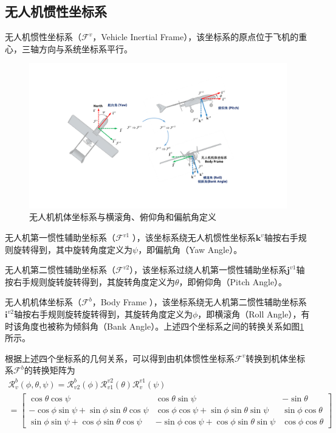 \subsection{无人机惯性坐标系}
无人机惯性坐标系（$\mathcal{F}^v$，Vehicle Inertial Frame），该坐标系的原点位于飞机的重心，三轴方向与系统坐标系平行。

\begin{figure}[htb]   
	\centering
	\includegraphics[width=\textwidth]{figs/chp02/chp02_02_uav_rpy.pdf}
	\caption{无人机机体坐标系与横滚角、俯仰角和偏航角定义}
	\label{fig:chp02_02_uav_rpy}
\end{figure}

无人机第一惯性辅助坐标系（$\mathcal{F}^{v1}$ ），该坐标系绕无人机惯性坐标系$\mathbf{k}^v$轴按右手规则旋转得到，其中旋转角度定义为$\psi$，即偏航角（Yaw Angle）。

无人机第二惯性辅助坐标系（$\mathcal{F}^{v2}$），该坐标系过绕人机第一惯性辅助坐标系$\mathbf{j}^{v1}$轴按右手规则旋转旋转得到，其旋转角度定义为$\theta$，即俯仰角（Pitch Angle）。

无人机机体坐标系（$\mathcal{F}^b$，Body Frame ），该坐标系绕无人机第二惯性辅助坐标系$\mathbf{i}^{v2}$轴按右手规则旋转旋转得到，其旋转角度定义为$\phi$，即横滚角（Roll Angle），有时该角度也被称为倾斜角（Bank Angle）。上述四个坐标系之间的转换关系如图\ref{fig:chp02_02_uav_rpy}所示。

根据上述四个坐标系的几何关系，可以得到由机体惯性坐标系$\mathcal{F}^v$转换到机体坐标系$\mathcal{F}^b$的转换矩阵为
\begin{multline}
\mathcal{R}_v^b(\phi, \theta, \psi) =\mathcal{R}_{v2}^b(\phi)\mathcal{R}_{v1}^{v2}(\theta)\mathcal{R}_v^{v1}(\psi) \\
=\begin{bmatrix}
\cos \theta \cos \psi                             & \cos\theta \sin\psi                               & -\sin\theta         \\
-\cos\phi \sin\psi + \sin\phi \sin\theta \cos\psi & \cos\phi \cos\psi + \sin\phi \sin\theta\sin\psi   & \sin\phi \cos\theta \\
\sin\phi \sin\psi + \cos\phi \sin\theta \cos\psi  & -\sin\phi \cos\psi + \cos\phi \sin\theta \sin\psi & \cos\phi \cos\theta
\end{bmatrix}
\end{multline}


